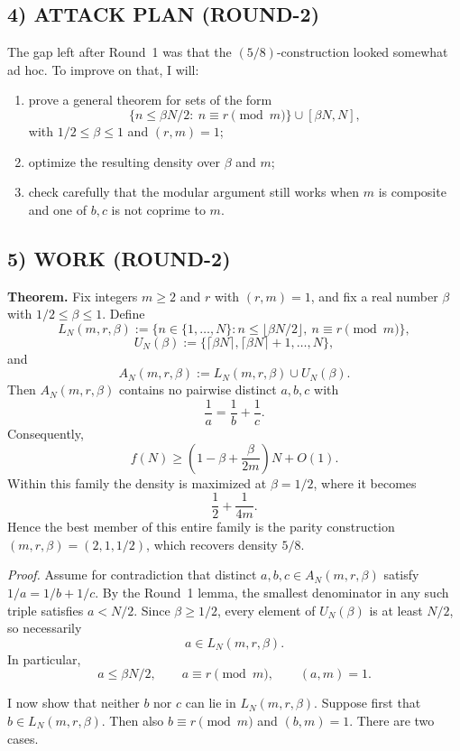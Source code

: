 \subsection*{4) ATTACK PLAN (ROUND-2)}
The gap left after Round~1 was that the \((5/8)\)-construction looked somewhat ad hoc.
To improve on that, I will:
\begin{enumerate}
\item prove a general theorem for sets of the form
\[
  \{n\le \beta N/2:\ n\equiv r\pmod m\}\cup [\beta N,N],
\]
with \(1/2\le \beta\le 1\) and \((r,m)=1\);
\item optimize the resulting density over \(\beta\) and \(m\);
\item check carefully that the modular argument still works when \(m\) is composite and one of \(b,c\) is not coprime to \(m\).
\end{enumerate}

\subsection*{5) WORK (ROUND-2)}
\textbf{Theorem.}
Fix integers \(m\ge 2\) and \(r\) with \((r,m)=1\), and fix a real number \(\beta\) with \(1/2\le \beta\le 1\).
Define
\[
  L_N(m,r,\beta):=\{n\in\{1,\dots,N\}: n\le \lfloor \beta N/2\rfloor,\ n\equiv r\pmod m\},
\]
\[
  U_N(\beta):=\{\lceil \beta N\rceil,\lceil \beta N\rceil+1,\dots,N\},
\]
and
\[
  A_N(m,r,\beta):=L_N(m,r,\beta)\cup U_N(\beta).
\]
Then \(A_N(m,r,\beta)\) contains no pairwise distinct \(a,b,c\) with
\[
  \frac1a=\frac1b+\frac1c.
\]
Consequently,
\[
  f(N)\ge \left(1-\beta+\frac{\beta}{2m}\right)N+O(1).
\]
Within this family the density is maximized at \(\beta=1/2\), where it becomes
\[
  \frac12+\frac{1}{4m}.
\]
Hence the best member of this entire family is the parity construction \((m,r,\beta)=(2,1,1/2)\), which recovers density \(5/8\).

\medskip
\textit{Proof.}
Assume for contradiction that distinct \(a,b,c\in A_N(m,r,\beta)\) satisfy \(1/a=1/b+1/c\).
By the Round~1 lemma, the smallest denominator in any such triple satisfies \(a<N/2\).
Since \(\beta\ge 1/2\), every element of \(U_N(\beta)\) is at least \(N/2\), so necessarily
\[
  a\in L_N(m,r,\beta).
\]
In particular,
\[
  a\le \beta N/2,
  \qquad a\equiv r\pmod m,
  \qquad (a,m)=1.
\]

I now show that neither \(b\) nor \(c\) can lie in \(L_N(m,r,\beta)\).
Suppose first that \(b\in L_N(m,r,\beta)\).
Then also \(b\equiv r\pmod m\) and \((b,m)=1\).
There are two cases.

